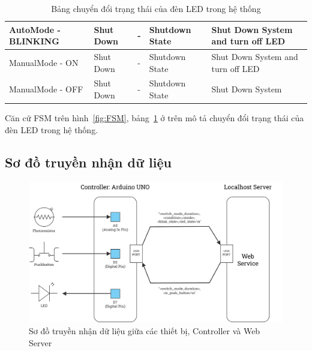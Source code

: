 {\begin{table}[H]
\begin{tabular}{|p{2.3cm}|p{3cm}|p{4cm}|p{2cm}|p{4cm}|}
AutoMode - BLINKING                                                 & Shut Down                                                  & -                                                              & Shutdown State                                                               & Shut Down System and turn off LED         \\ \hline
ManualMode - ON                                                     & Shut Down                                                  & -                                                              & Shutdown State                                                               & Shut Down System and turn off LED         \\ \hline
ManualMode - OFF                                                    & Shut Down                                                  & -                                                              & Shutdown State                                                               & Shut Down System                          \\ \hline
\end{tabular}
\caption{Bảng chuyển đổi trạng thái của đèn LED trong hệ thống}
\label{tab:FSM}
\end{table}

Căn cứ FSM trên hình~\ref{fig:FSM}, bảng~\ref{tab:FSM} ở trên mô tả chuyển đổi trạng thái của đèn LED trong hệ thống. 


\subsection{Sơ đồ truyền nhận dữ liệu}
\begin{figure}[H]
    \centering
    \includegraphics[scale=0.19]{img/Data.jpg}
    \caption{Sơ đồ truyền nhận dữ liệu giữa các thiết bị, Controller và Web Server}
    \label{fig:Data}
\end{figure}

}
